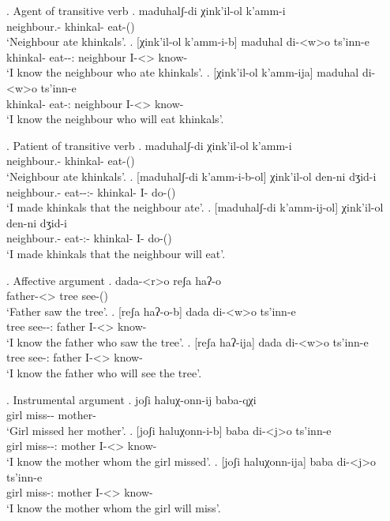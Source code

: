 \ex. Agent of transitive verb
	\ag. maduhalʃ-di χink'il-ol k'amm-i\\
			{neighbour.\Obl-\Erg} {khinkal-\Pl} {eat-\Pst(\Aor)}\\
			\glt `Neighbour ate khinkals'.
	\bg. [χink'il-ol k'amm-i-b] maduhal di-<w>o ts'inn-e \\
			{khinkal-\Pl} {eat-\Pst-\Ptcp:\Pst} neighbour {I-<\M>\Aff} {know-\Hab} \\
		 \glt    `I know the neighbour who ate khinkals'.
	\bg. [χink'il-ol k'amm-ija] maduhal di-<w>o ts'inn-e \\
			{khinkal-\Pl} {eat-\Ptcp:\Pres} neighbour {I-<\M>\Aff} {know-\Hab} \\
		 \glt    `I know the neighbour who will eat khinkals'.

\ex. Patient of transitive verb
	\ag. maduhalʃ-di χink'il-ol k'amm-i\\
			{neighbour.\Obl-\Erg} {khinkal-\Pl} {eat-\Pst(\Aor)}\\
			\glt `Neighbour ate khinkals'.
	\bg. [maduhalʃ-di k'amm-i-b-ol] χink'il-ol den-ni dʒid-i\\
			{neighbour.\Obl-\Erg} {eat-\Pst-\Ptcp:\Pst-\Pl} {khinkal-\Pl}  {I-\Erg} {do-\Pst(\Aor)}\\
		 \glt    `I made khinkals that the neighbour ate'.
	\bg. [maduhalʃ-di k'amm-ij-ol] χink'il-ol den-ni dʒid-i\\
			{neighbour.\Obl-\Erg} {eat-\Ptcp:\Pres-\Pl} {khinkal-\Pl}  {I-\Erg} {do-\Pst(\Aor)}\\
		 \glt    `I made khinkals that the neighbour will eat'.		

\ex. Affective argument
	\ag. dada-<r>o reʃa haʔ-o\\
			{father-<\Nans>\Aff} tree {see-\Pst(\Aor)}\\
			\glt `Father saw the tree'.
	\bg. [reʃa haʔ-o-b] dada di-<w>o ts'inn-e\\
			tree {see-\Pst-\Ptcp:\Pst} father {I-<\M>\Aff} {know-\Hab}\\
			\glt `I know the father who saw the tree'.
	\bg. [reʃa haʔ-ija] dada di-<w>o ts'inn-e\\
			tree {see-\Ptcp:\Pres} father {I-<\M>\Aff} {know-\Hab}\\
			\glt `I know the father who will see the tree'.

\ex. Instrumental argument
	\ag. joʃi haluχ-onn-ij baba-qχi\\
			{girl} {miss-\Pst-\Pf} {mother-\Inst}\\
			\glt `Girl missed her mother'.
	\bg. [joʃi haluχonn-i-b] baba  di-<j>o ts'inn-e\\
			{girl} {miss-\Pst-\Ptcp:\Pst} mother {I-<\M>\Aff} {know-\Hab}\\
			\glt `I know the mother  whom the girl missed'.
	\bg. [joʃi haluχonn-ija] baba  di-<j>o ts'inn-e\\
			{girl} {miss-\Ptcp:\Pres} mother {I-<\M>\Aff} {know-\Hab}\\
			\glt `I know the mother  whom the girl will miss'.

